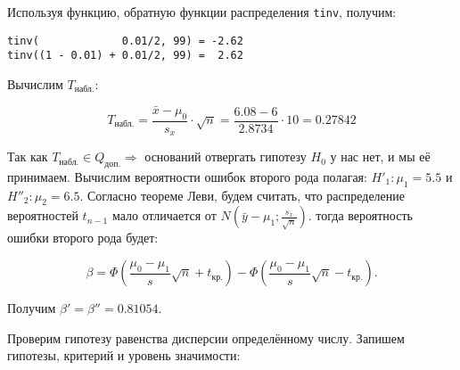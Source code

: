 \documentclass{report}
\begin{document}

Используя функцию, обратную функции распределения \lstinline{tinv}, получим:

\begin{lstlisting}
tinv(             0.01/2, 99) = -2.62
tinv((1 - 0.01) + 0.01/2, 99) =  2.62
\end{lstlisting}

Вычислим $T_\text{набл.}$:

\begin{equation}
T_\text{набл.} = \frac{\bar x - \mu_0}{s_x} \cdot \sqrt{n} = \frac{6.08 - 6}{2.8734} \cdot 10 = 0.27842
\end{equation}

Так как $T_\text{набл.} \in Q_\text{доп.} \Rightarrow$ оснований отвергать гипотезу $H_0$ у нас нет, и мы её принимаем.
Вычислим вероятности ошибок второго рода полагая: $H'_1 : \mu_1 = 5.5$ и $H''_2 : \mu_2 = 6.5$. Согласно теореме Леви, будем считать, что распределение вероятностей $t_{n-1}$ мало отличается от $N\left(\bar y - \mu_1; \frac{s_x}{\sqrt{n}} \right)$. тогда вероятность ошибки второго рода будет:

\begin{equation*}
\beta = \Phi \left( \frac{\mu_0 - \mu_1}{s}\sqrt{n} + t_{\text{кр.}}\right) - 
        \Phi \left( \frac{\mu_0 - \mu_1}{s}\sqrt{n} - t_{\text{кр.}}\right).
\end{equation*}

Получим $\beta' = \beta'' = 0.81054$.

Проверим гипотезу равенства дисперсии определённому числу. 
Запишем гипотезы, критерий и уровень значимости:
\end{document}
